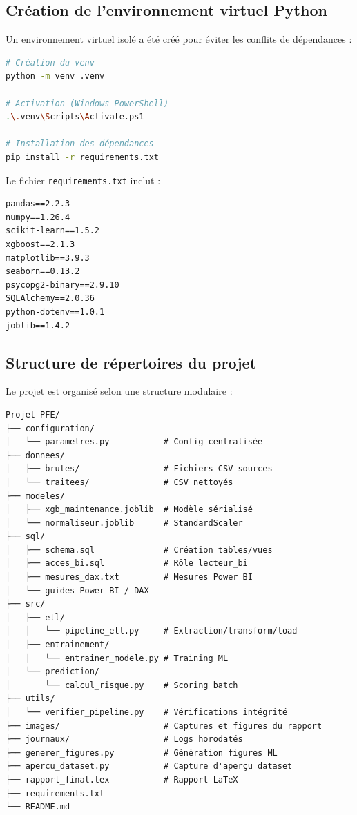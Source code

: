 \documentclass[a4paper,12pt]{report}
\begin{document}
\subsection{Création de l'environnement virtuel Python}

Un environnement virtuel isolé a été créé pour éviter les conflits de dépendances :

\begin{lstlisting}[language=bash]
# Création du venv
python -m venv .venv

# Activation (Windows PowerShell)
.\.venv\Scripts\Activate.ps1

# Installation des dépendances
pip install -r requirements.txt
\end{lstlisting}

Le fichier \texttt{requirements.txt} inclut :

\begin{lstlisting}
pandas==2.2.3
numpy==1.26.4
scikit-learn==1.5.2
xgboost==2.1.3
matplotlib==3.9.3
seaborn==0.13.2
psycopg2-binary==2.9.10
SQLAlchemy==2.0.36
python-dotenv==1.0.1
joblib==1.4.2
\end{lstlisting}

\subsection{Structure de répertoires du projet}

Le projet est organisé selon une structure modulaire :

\begin{verbatim}
Projet PFE/
├── configuration/
│   └── parametres.py           # Config centralisée
├── donnees/
│   ├── brutes/                 # Fichiers CSV sources
│   └── traitees/               # CSV nettoyés
├── modeles/
│   ├── xgb_maintenance.joblib  # Modèle sérialisé
│   └── normaliseur.joblib      # StandardScaler
├── sql/
│   ├── schema.sql              # Création tables/vues
│   ├── acces_bi.sql            # Rôle lecteur_bi
│   ├── mesures_dax.txt         # Mesures Power BI
│   └── guides Power BI / DAX
├── src/
│   ├── etl/
│   │   └── pipeline_etl.py     # Extraction/transform/load
│   ├── entrainement/
│   │   └── entrainer_modele.py # Training ML
│   └── prediction/
│       └── calcul_risque.py    # Scoring batch
├── utils/
│   └── verifier_pipeline.py    # Vérifications intégrité
├── images/                     # Captures et figures du rapport
├── journaux/                   # Logs horodatés
├── generer_figures.py          # Génération figures ML
├── apercu_dataset.py           # Capture d'aperçu dataset
├── rapport_final.tex           # Rapport LaTeX
├── requirements.txt
└── README.md
\end{verbatim}
\end{document}
